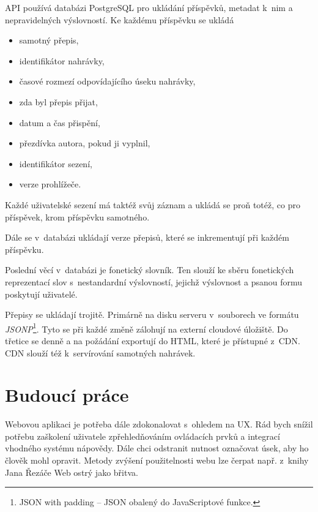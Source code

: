 API používá databázi PostgreSQL pro ukládání příspěvků, metadat k~nim a nepravidelných
výslovností. Ke každému příspěvku se ukládá
\begin{itemize}
\item{samotný přepis,}
\item{identifikátor nahrávky,}
\item{časové rozmezí odpovídajícího úseku nahrávky,}
\item{zda byl přepis přijat,}
\item{datum a čas přispění,}
\item{přezdívka autora, pokud ji vyplnil,}
\item{identifikátor sezení,}
\item{verze prohlížeče.}
\end{itemize}

Každé uživatelské sezení má taktéž svůj záznam a ukládá se proň totéž, co pro
příspěvek, krom příspěvku samotného.

Dále se v~databázi ukládají verze přepisů, které se inkrementují při každém
příspěvku.

Poslední věcí v~databázi je fonetický slovník. Ten slouží ke sběru fonetických
reprezentací slov s~nestandardní výslovností, jejichž výslovnost a psanou formu
poskytují uživatelé.

Přepisy se ukládají trojitě. Primárně na disku serveru v~souborech ve formátu {\em
JSONP}\footnote{JSON with padding -- JSON obalený do JavaScriptové funkce.}.
Tyto se při každé změně zálohují na externí cloudové úložiště. Do třetice se
denně a na požádání exportují do HTML, které je přístupné z~CDN.
CDN slouží též k~servírování samotných nahrávek.


\section{Budoucí práce}

Webovou aplikaci je potřeba dále zdokonalovat s~ohledem na UX. Rád bych
snížil potřebu zaškolení uživatele zpřehledňováním ovládacích prvků a
integrací vhodného systému nápovědy. Dále chci odstranit nutnost označovat
úsek, aby ho člověk mohl opravit.
Metody zvýšení použitelnosti webu lze čerpat např. z~knihy Jana Řezáče Web
ostrý jako břitva\cite{rezac2016web}.
